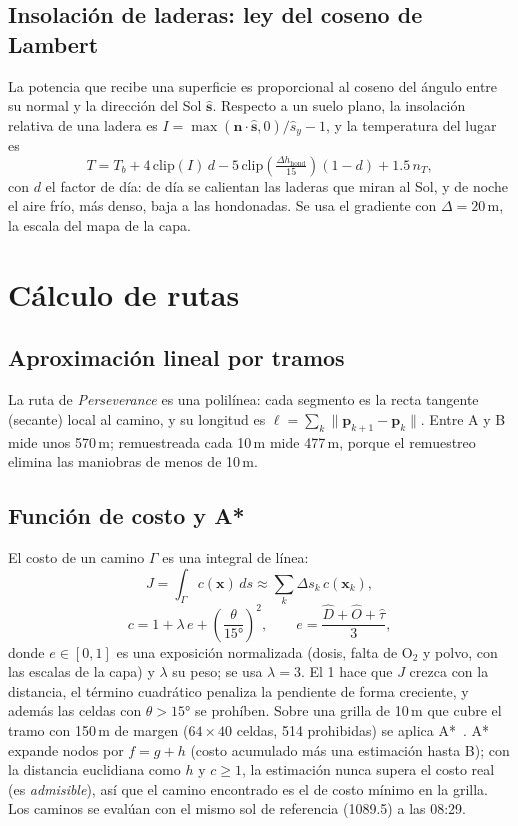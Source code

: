 \documentclass[conference]{IEEEtran}
\begin{document}
\subsection{Insolación de laderas: ley del coseno de Lambert}\label{sec:lambert}
La potencia que recibe una superficie es proporcional al coseno del ángulo entre su normal y la dirección del Sol $\hat{\mathbf s}$. Respecto a un suelo plano, la insolación relativa de una ladera es $I = \max(\mathbf n\cdot\hat{\mathbf s},0)/\hat s_y - 1$, y la temperatura del lugar es
\begin{equation}
T = T_b + 4\,\mathrm{clip}(I)\,d - 5\,\mathrm{clip}\!\left(\tfrac{\Delta h_{\text{hond}}}{15}\right)(1-d) + 1.5\,n_T,
\end{equation}
con $d$ el factor de día: de día se calientan las laderas que miran al Sol, y de noche el aire frío, más denso, baja a las hondonadas. Se usa el gradiente con $\Delta = 20$\,m, la escala del mapa de la capa.

\section{Cálculo de rutas}
\subsection{Aproximación lineal por tramos}
La ruta de \emph{Perseverance} es una polilínea: cada segmento es la recta tangente (secante) local al camino, y su longitud es $\ell = \sum_k\lVert\mathbf p_{k+1}-\mathbf p_k\rVert$. Entre A y B mide unos 570\,m; remuestreada cada 10\,m mide 477\,m, porque el remuestreo elimina las maniobras de menos de 10\,m.

\subsection{Función de costo y A*}
El costo de un camino $\Gamma$ es una integral de línea:
\begin{equation}
J = \int_\Gamma c(\mathbf x)\,ds \approx \sum_k \Delta s_k\, c(\mathbf x_k),
\end{equation}
\begin{equation}
c = 1 + \lambda\, e + \left(\frac{\theta}{15°}\right)^2,\qquad e = \frac{\hat D + \hat O + \hat\tau}{3},
\end{equation}
donde $e\in[0,1]$ es una exposición normalizada (dosis, falta de O$_2$ y polvo, con las escalas de la capa) y $\lambda$ su peso; se usa $\lambda = 3$. El 1 hace que $J$ crezca con la distancia, el término cuadrático penaliza la pendiente de forma creciente, y además las celdas con $\theta > 15°$ se prohíben. Sobre una grilla de 10\,m que cubre el tramo con 150\,m de margen ($64\times40$ celdas, 514 prohibidas) se aplica A*~\cite{hart1968}. A* expande nodos por $f = g + h$ (costo acumulado más una estimación hasta B); con la distancia euclidiana como $h$ y $c \ge 1$, la estimación nunca supera el costo real (es \emph{admisible}), así que el camino encontrado es el de costo mínimo en la grilla. Los caminos se evalúan con el mismo sol de referencia (1089.5) a las 08{:}29.
\end{document}
